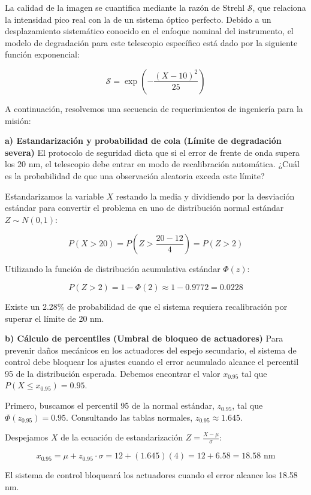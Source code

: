 La calidad de la imagen se cuantifica mediante la razón de Strehl $\mathcal{S}$, que relaciona la intensidad pico real con la de un sistema óptico perfecto. Debido a un desplazamiento sistemático conocido en el enfoque nominal del instrumento, el modelo de degradación para este telescopio específico está dado por la siguiente función exponencial:

$$ \mathcal{S} = \exp\left( -\frac{(X - 10)^2}{25} \right) $$

A continuación, resolvemos una secuencia de requerimientos de ingeniería para la misión:

\textbf{a) Estandarización y probabilidad de cola (Límite de degradación severa)}
El protocolo de seguridad dicta que si el error de frente de onda supera los 20 nm, el telescopio debe entrar en modo de recalibración automática. ¿Cuál es la probabilidad de que una observación aleatoria exceda este límite?

Estandarizamos la variable $X$ restando la media y dividiendo por la desviación estándar para convertir el problema en uno de distribución normal estándar $Z \sim N(0, 1)$:

$$ P(X > 20) = P\left(Z > \frac{20 - 12}{4}\right) = P(Z > 2) $$

Utilizando la función de distribución acumulativa estándar $\Phi(z)$:

$$ P(Z > 2) = 1 - \Phi(2) \approx 1 - 0.9772 = 0.0228 $$

Existe un 2.28\% de probabilidad de que el sistema requiera recalibración por superar el límite de 20 nm.

\textbf{b) Cálculo de percentiles (Umbral de bloqueo de actuadores)}
Para prevenir daños mecánicos en los actuadores del espejo secundario, el sistema de control debe bloquear los ajustes cuando el error acumulado alcance el percentil 95 de la distribución esperada. Debemos encontrar el valor $x_{0.95}$ tal que $P(X \le x_{0.95}) = 0.95$.

Primero, buscamos el percentil 95 de la normal estándar, $z_{0.95}$, tal que $\Phi(z_{0.95}) = 0.95$. Consultando las tablas normales, $z_{0.95} \approx 1.645$. 

Despejamos $X$ de la ecuación de estandarización $Z = \frac{X - \mu}{\sigma}$:

$$ x_{0.95} = \mu + z_{0.95} \cdot \sigma = 12 + (1.645)(4) = 12 + 6.58 = 18.58 \text{ nm} $$

El sistema de control bloqueará los actuadores cuando el error alcance los 18.58 nm.

